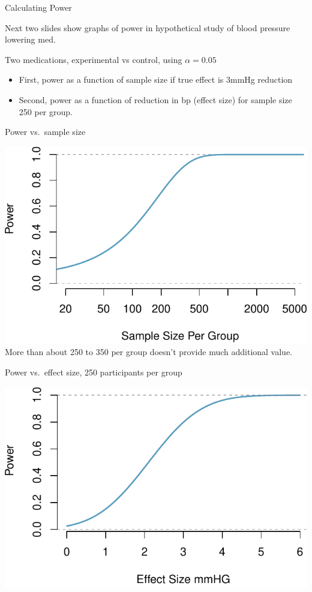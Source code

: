 \documentclass[ignorenonframetext,]{beamer}
\begin{document}
\begin{frame}{Calculating Power}

Next two slides show graphs of power in hypothetical study of blood
pressure lowering med. \medskip

Two medications, experimental vs control, using \(\alpha = 0.05\)

\begin{itemize}
\item
  First, power as a function of sample size if true effect is 3mmHg
  reduction
\item
  Second, power as a function of reduction in bp (effect size) for
  sample size 250 per group.
\end{itemize}

\end{frame}

\begin{frame}{Power vs.~sample size}

\includegraphics{reporter_course_harrington_files/figure-beamer/power_sample-1.pdf}\\
More than about 250 to 350 per group doesn't provide much additional
value.

\end{frame}

\begin{frame}{Power vs.~effect size, 250 participants per group}

\includegraphics{reporter_course_harrington_files/figure-beamer/power_effect-1.pdf}\\

\end{frame}
\end{document}
